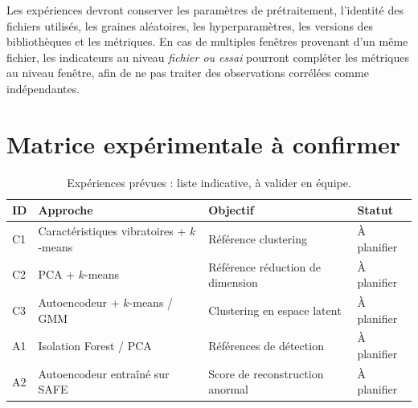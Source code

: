 Les expériences devront conserver les paramètres de prétraitement, l'identité des fichiers utilisés, les graines aléatoires, les hyperparamètres, les versions des bibliothèques et les métriques. En cas de multiples fenêtres provenant d'un même fichier, les indicateurs au niveau \emph{fichier ou essai} pourront compléter les métriques au niveau fenêtre, afin de ne pas traiter des observations corrélées comme indépendantes.

\section{Matrice expérimentale à confirmer}
\begin{table}[htbp]
\centering\small
\caption{Expériences prévues : liste indicative, à valider en équipe.}
\label{tab:experiences}
\begin{tabularx}{\textwidth}{@{}p{18mm}XXp{23mm}@{}}
\toprule
\bfseries ID & \bfseries Approche & \bfseries Objectif & \bfseries Statut\\
\midrule
C1 & Caractéristiques vibratoires + $k$-means & Référence clustering & À planifier\\
C2 & PCA + $k$-means & Référence réduction de dimension & À planifier\\
C3 & Autoencodeur + $k$-means / GMM & Clustering en espace latent & À planifier\\
A1 & Isolation Forest / PCA & Références de détection & À planifier\\
A2 & Autoencodeur entraîné sur SAFE & Score de reconstruction anormal & À planifier\\
\bottomrule
\end{tabularx}
\end{table}

